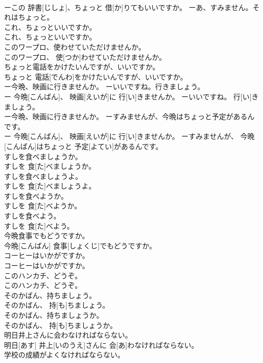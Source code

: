 \documentclass[8pt]{extreport}
\begin{document}
\begin{CJK}{UTF8}{min}
\\	ーこの 辞書[じしょ]、ちょっと 借[か]りてもいいですか。 ーあ、すみません。それはちょっと。
\\	これ、ちょっといいですか。	
\\	これ、ちょっといいですか。
\\	このワープロ、使わせていただけませんか。	
\\	このワープロ、 使[つか]わせていただけませんか。
\\	ちょっと電話をかけたいんですが、いいですか。	
\\	ちょっと 電話[でんわ]をかけたいんですが、いいですか。
\\	ー今晩、映画に行きませんか。 ーいいですね。行きましょう。	
\\	ー 今晩[こんばん]、 映画[えいが]に 行[い]きませんか。 ーいいですね。 行[い]きましょう。
\\	ー今晩、映画に行きませんか。 ーすみませんが、今晩はちょっと予定があるんです。	
\\	ー 今晩[こんばん]、 映画[えいが]に 行[い]きませんか。 ーすみませんが、 今晩[こんばん]はちょっと 予定[よてい]があるんです。
\\	すしを食べましょうか。	
\\	すしを 食[た]べましょうか。
\\	すしを食べましょうよ。	
\\	すしを 食[た]べましょうよ。
\\	すしを食べようか。	
\\	すしを 食[た]べようか。
\\	すしを食べよう。	
\\	すしを 食[た]べよう。
\\	今晩食事でもどうですか。	
\\	今晩[こんばん] 食事[しょくじ]でもどうですか。
\\	コーヒーはいかがですか。	
\\	コーヒーはいかがですか。
\\	このハンカチ、どうぞ。	
\\	このハンカチ、どうぞ。
\\	そのかばん、持ちましょう。	
\\	そのかばん、 持[も]ちましょう。
\\	そのかばん、持ちましょうか。	
\\	そのかばん、 持[も]ちましょうか。
\\	明日井上さんに会わなければならない。	
\\	明日[あす] 井上[いのうえ]さんに 会[あ]わなければならない。
\\	学校の成績がよくなければならない。	

\end{CJK}
\end{document}
